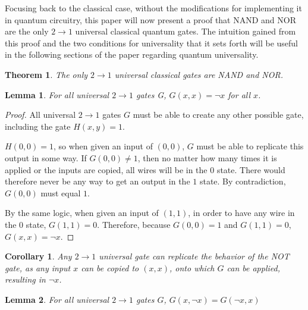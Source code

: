 \documentclass[12pt]{article}
\begin{document}
Focusing back to the classical case, without the modifications for implementing it in quantum circuitry, this paper will now present a proof that NAND and NOR are the only $2 \to 1$ universal classical quantum gates. The intuition gained from this proof and the two conditions for universality that it sets forth will be useful in the following sections of the paper regarding quantum universality.


\newtheorem{theorem}{Theorem}
\newtheorem{lemma}{Lemma}
\newtheorem{corollary}{Corollary}

\begin{theorem}
    The only $2 \to 1$ universal classical gates are NAND and NOR.
\end{theorem}

\begin{lemma}
    For all universal $2 \to 1$ gates G, $G(x, x) = \neg x$ for all $x$.
\end{lemma}

\begin{proof}
    All universal $2 \to 1$ gates $G$ must be able to create any other possible gate, including the gate $H(x, y) = 1$.

    $H(0, 0) = 1$, so when given an input of $(0, 0)$, $G$ must be able to replicate this output in some way. If $G(0, 0) \ne 1$, then no matter how many times it is applied or the inputs are copied, all wires will be in the $0$ state. There would therefore never be any way to get an output in the $1$ state. By contradiction, $G(0, 0)$ must equal $1$.
    
    By the same logic, when given an input of $(1, 1)$, in order to have any wire in the $0$ state, $G(1, 1) = 0$.
    Therefore, because $G(0, 0) = 1$ and $G(1, 1) = 0$, $G(x, x) = \neg x$. 
\end{proof}

\begin{corollary}
    Any $2 \to 1$ universal gate can replicate the behavior of the NOT gate, as any input $x$ can be copied to $(x, x)$, onto which $G$ can be applied, resulting in $\neg x$.
\end{corollary}

\begin{lemma}
    For all universal $2 \to 1$ gates $G$,
    $G(x, \neg x) = G(\neg x, x)$
\end{lemma}
\end{document}

